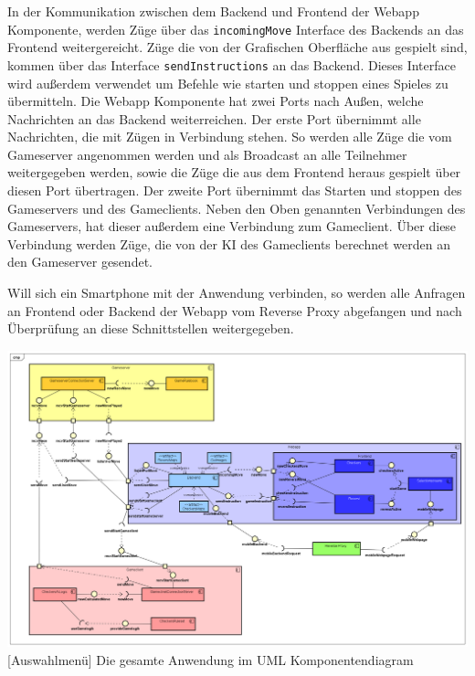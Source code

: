 \documentclass[12pt,a4paper,bibliography=totocnumbered,listof=totocnumbered]{article}
\begin{document}
In der Kommunikation zwischen dem Backend und Frontend der Webapp Komponente, werden Züge über das \texttt{incomingMove} Interface des Backends an das Frontend
weitergereicht. Züge die von der Grafischen Oberfläche aus gespielt sind, kommen über das Interface \texttt{sendInstructions} an das Backend. Dieses
Interface wird außerdem verwendet um Befehle wie starten und stoppen eines Spieles zu übermitteln. Die Webapp Komponente hat zwei Ports nach Außen, 
welche Nachrichten an das Backend
weiterreichen. Der erste Port übernimmt alle Nachrichten, die mit Zügen in Verbindung stehen. So werden alle Züge die vom Gameserver angenommen werden
und als Broadcast an alle Teilnehmer weitergegeben werden, sowie die Züge die aus dem Frontend heraus gespielt über diesen Port übertragen.
Der zweite Port übernimmt das Starten und stoppen des Gameservers und des Gameclients. 
Neben den Oben genannten Verbindungen des Gameservers, hat dieser außerdem eine Verbindung zum Gameclient. Über diese Verbindung werden Züge, die von der 
KI des Gameclients berechnet werden an den Gameserver gesendet.

Will sich ein Smartphone mit der Anwendung verbinden, so werden alle Anfragen an Frontend oder Backend der Webapp vom Reverse Proxy abgefangen und 
nach Überprüfung an diese Schnittstellen weitergegeben.


\vspace{1em}
\begin{minipage}{\linewidth}
	\centering
	\includegraphics[width=1.0\linewidth]{pics/Komponentendiagram.png}
	[Auswahlmenü]{ Die gesamte Anwendung im UML Komponentendiagram}
	\label{fig:ComponentDiagram}
\end{minipage}
\end{document}
